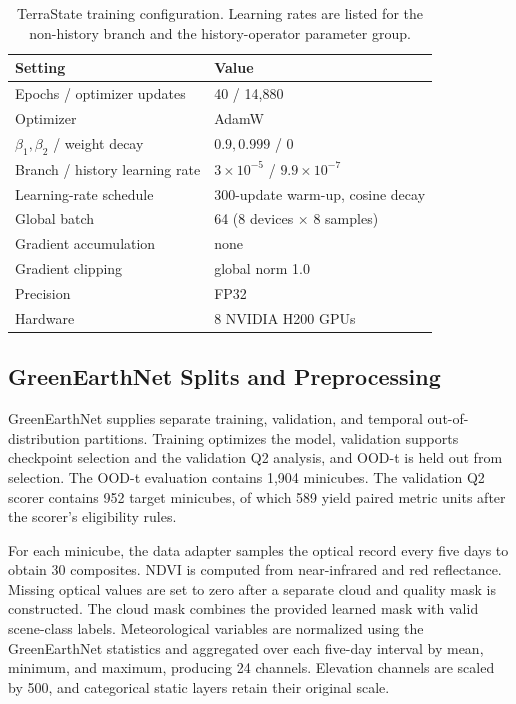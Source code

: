 \documentclass[letterpaper]{article}
\begin{document}
\begin{table}[t]
\centering
{\small
\setlength{\tabcolsep}{3pt}
\begin{tabular}{@{}ll@{}}
\toprule
Setting & Value\\
\midrule
Epochs / optimizer updates & 40 / 14,880\\
Optimizer & AdamW\\
\(\beta_1,\beta_2\) / weight decay & \(0.9,0.999\) / 0\\
Branch / history learning rate & \(3{\times}10^{-5}\) / \(9.9{\times}10^{-7}\)\\
Learning-rate schedule & 300-update warm-up, cosine decay\\
Global batch & 64 (8 devices \(\times\) 8 samples)\\
Gradient accumulation & none\\
Gradient clipping & global norm 1.0\\
Precision & FP32\\
Hardware & 8 NVIDIA H200 GPUs\\
\bottomrule
\end{tabular}
}
\caption{TerraState training configuration. Learning rates are listed for the
non-history branch and the history-operator parameter group.}
\label{tab:training}
\end{table}

\subsection{GreenEarthNet Splits and Preprocessing}

GreenEarthNet supplies separate training, validation, and temporal
out-of-distribution partitions. Training optimizes the model, validation
supports checkpoint selection and the validation Q2 analysis, and OOD-t is
held out from selection. The OOD-t evaluation contains 1,904 minicubes. The
validation Q2 scorer contains 952 target minicubes, of which 589 yield paired
metric units after the scorer's eligibility rules.

For each minicube, the data adapter samples the optical record every five days
to obtain 30 composites. NDVI is computed from near-infrared and red
reflectance. Missing optical values are set to zero after a separate cloud and
quality mask is constructed. The cloud mask combines the provided learned
mask with valid scene-class labels. Meteorological variables are normalized
using the GreenEarthNet statistics and aggregated over each five-day interval
by mean, minimum, and maximum, producing 24 channels. Elevation channels are
scaled by 500, and categorical static layers retain their original scale.
\end{document}
